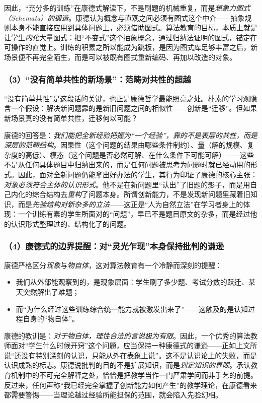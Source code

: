 因此，“充分多的训练”在康德式解读下，不是刷题的机械重复，而是\textit{想象力图式（Schemata）的锻造}。康德认为概念与直观之间必须有图式这个中介——抽象规则本身不能直接应用到具体问题上，必须借助图式。算法教育的目标，本质上就是让学生\textit{内化}大量图式：把“不变式”这个抽象概念，通过归纳法证明的图式，锚定在可操作的直觉上。训练的积累之所以能成为跳板，是因为图式库足够丰富之后，新场景便不再完全陌生，而是可以被既有图式重新编码、再加以改造的对象。


\subsubsection{（3）“没有简单共性的新场景”：范畴对共性的超越}

“没有简单共性”是这段话的关键，也正是康德哲学最能照亮之处。朴素的学习观隐含一个假设：解决新问题靠的是新旧问题之间的相似性——创新是“迁移”。但如果新场景真的没有简单共性，迁移何以可能？

康德的回答是：\textit{我们能把全新经验把握为“一个经验”，靠的不是表层的共性，而是深层的范畴结构}。因果性（这个问题的结果由哪些条件制约）、量（解的规模、复杂度的高低）、模态（这个问题是否必然可解、在什么条件下可能可解）——这些不是从任何具体题目中归纳出来的，而是任何问题被思考为问题时就已经动用的形式。因此，面对全新问题仍能拿出好办法的学生，其行为印证了康德的核心主张：\textit{对象必须符合主体的认识形式}。他不是在新问题里“认出”了旧题的影子，而是用自己内化的综合结构去\textit{重构}了问题本身。所谓创新能力，不是发现新问题里藏着旧知识，而是\textit{先验结构对新杂多的立法}——这正是“人为自然立法”在学习者身上的体现：一个训练有素的学生所面对的“问题”，早已不是题目原文的杂多，而是经过他的认识形式整理过的、结构化了的问题。

\subsubsection{（4）康德式的边界提醒：对“灵光乍现”本身保持批判的谦逊}

康德严格区分\textit{现象}与\textit{物自体}，这对算法教育有一个冷静而深刻的提醒：
\begin{itemize}
    \item 我们从外部能观察到的，是现象层面：学生刷了多少题、考试分数的跃迁、某天突然解出了难题；
    \item 而“为什么经过这些训练综合统一能力就被激发出来了”——这触及的是认知过程自身的“物自体”。
\end{itemize}

康德的教训是：\textit{对于物自体，理性合法的言说极为有限}。因此，一个优秀的算法教师面对“学生什么时候开窍”这个问题，应当保持一种康德式的谦逊——正如上文所说“还没有特别深刻的认识，只能从外在表象上说”。这不是认识论上的失败，而是认识成熟的标志。康德说批判的目的不是扩展知识，而是\textit{划定知识的界限}。承认教育机制中的不可完全解释之处，恰恰是把教学当作一门严肃学问而非手艺的前提。反过来，任何声称“我已经完全掌握了创新能力如何产生”的教学理论，在康德看来都需要警惕——当理论越过经验所能担保的范围，就会陷入先验幻相。


